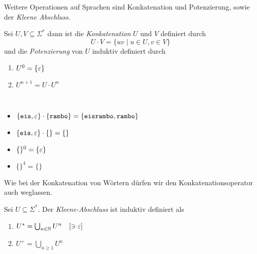 Weitere Operationen auf Sprachen sind Konkatenation und Potenzierung, sowie der \emph{Kleene Abschluss}.
\begin{Def} %
	Sei $U,V\subseteq \Sigma^*$ dann ist die \emph{Konkatenation} $U$ und $V$ definiert durch
	\[ U\cdot V = \{uv \mid u\in U, v\in V \} \]
  und die \emph{Potenzierung} von $U$ induktiv definiert durch
  \begin{enumerate}
  \item $U^0 = \{\varepsilon\}$
  \item $U^{n+1} = U \cdot U^{n}$
  \end{enumerate}
\end{Def}
\begin{Bsp*}~
  \begin{itemize}
  \item $\{\mathtt{eis}, \varepsilon\} \cdot \{\mathtt{rambo}\} = \{\mathtt{eisrambo}, \mathtt{rambo}\}$
  \item $\{\mathtt{eis}, \varepsilon\} \cdot \{\} = \{\}$
  \item $\{\}^0 = \{\varepsilon\}$
  \item $\{\}^4 = \{\}$
  \end{itemize}
\end{Bsp*}
Wie bei der Konkatenation von Wörtern dürfen wir den Konkatenationsoperator auch weglassen.
%
\begin{Def}
	Sei $U\subseteq\Sigma^*$.
  Der \emph{Kleene-Abschluss} ist induktiv definiert als
  \begin{enumerate}
  \item 
    $U^* = \bigcup_{n\in\mathbb{N}} U^n \quad [\ni\varepsilon]$
  \item
		$U^+ = \bigcup_{n\ge1} U^n$
  \end{enumerate}
\end{Def}

